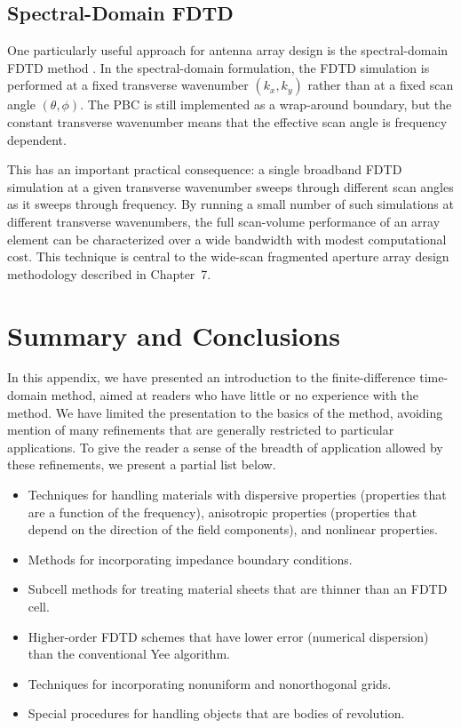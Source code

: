 \subsection{Spectral-Domain FDTD}
\label{sec:spectral_FDTD}

One particularly useful approach for antenna array design is the spectral-domain FDTD method \cite{Aminian}.  In the spectral-domain formulation, the FDTD simulation is performed at a fixed transverse wavenumber $(k_x, k_y)$ rather than at a fixed scan angle $(\theta, \phi)$.  The PBC is still implemented as a wrap-around boundary, but the constant transverse wavenumber means that the effective scan angle is frequency dependent.

This has an important practical consequence: a single broadband FDTD simulation at a given transverse wavenumber sweeps through different scan angles as it sweeps through frequency.  By running a small number of such simulations at different transverse wavenumbers, the full scan-volume performance of an array element can be characterized over a wide bandwidth with modest computational cost.  This technique is central to the wide-scan fragmented aperture array design methodology described in Chapter~7.

\section{Summary and Conclusions}

In this appendix, we have presented an introduction to the finite-difference time-domain method, aimed at readers who have little or no experience with the method.  We have limited the presentation to the basics of the method, avoiding mention of many refinements that are generally restricted to particular applications.  To give the reader a sense of the breadth of application allowed by these refinements, we present a partial list below.
\begin{itemize}
  \item{Techniques for handling materials with dispersive properties (properties that are a function of the frequency), anisotropic properties (properties that depend on the direction of the field components), and nonlinear properties.}
  \item{Methods for incorporating impedance boundary conditions.}
  \item{Subcell methods for treating material sheets that are thinner than an FDTD cell.}
  \item{Higher-order FDTD schemes that have lower error (numerical dispersion) than the conventional Yee algorithm.}
  \item{Techniques for incorporating nonuniform and nonorthogonal grids.}
  \item{Special procedures for handling objects that are bodies of revolution.}
\end{itemize}

